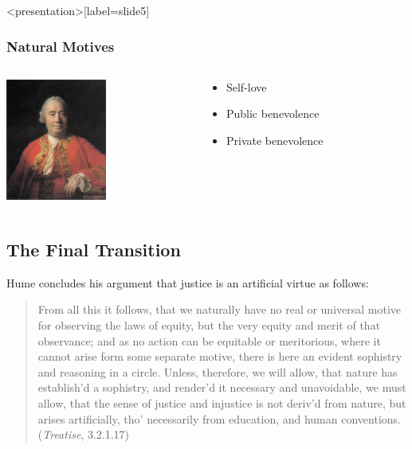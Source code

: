 \begin{frame}<presentation>[label=slide5]
    \frametitle{Natural Motives}
        \begin{columns}
            \begin{column}{3cm}
                \includegraphics[height=4cm]{../../graphics/hume.jpg}
            \end{column}
            \begin{column}{7cm}
                \begin{itemize}
                    \item Self-love
                    \item Public benevolence
                    \item Private benevolence
                \end{itemize}
            \end{column}
        \end{columns}
\end{frame}


\subsection{The Final Transition}\label{sec:the_final_transition} %

Hume concludes his argument that justice is an artificial virtue as follows:
\begin{quote}
    From all this it follows, that we naturally have no real or universal motive for observing the laws of equity, but the very equity and merit of that observance; and as no action can be equitable or meritorious, where it cannot arise form some separate motive, there is here an evident sophistry and reasoning in a circle. Unless, therefore, we will allow, that nature has establish’d a sophistry, and render’d it necessary and unavoidable, we must allow, that the sense of justice and injustice is not deriv’d from nature, but arises artificially, tho’ necessarily from education, and human conventions. (\emph{Treatise}, 3.2.1.17)
\end{quote}

